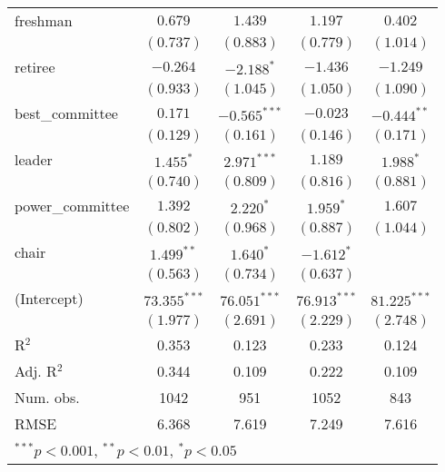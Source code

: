 \documentclass[12pt]{article}
\begin{document}
\begin{table}[H]
\begin{center}
\begin{tabular}{l c c c c }
			freshman               & $0.679$        & $1.439$         & $1.197$        & $0.402$        \\
			& $(0.737)$      & $(0.883)$       & $(0.779)$      & $(1.014)$      \\
			retiree                & $-0.264$       & $-2.188^{*}$    & $-1.436$       & $-1.249$       \\
			& $(0.933)$      & $(1.045)$       & $(1.050)$      & $(1.090)$      \\
			best\_committee        & $0.171$        & $-0.565^{***}$  & $-0.023$       & $-0.444^{**}$  \\
			& $(0.129)$      & $(0.161)$       & $(0.146)$      & $(0.171)$      \\
			leader                 & $1.455^{*}$    & $2.971^{***}$   & $1.189$        & $1.988^{*}$    \\
			& $(0.740)$      & $(0.809)$       & $(0.816)$      & $(0.881)$      \\
			power\_committee       & $1.392$        & $2.220^{*}$     & $1.959^{*}$    & $1.607$        \\
			& $(0.802)$      & $(0.968)$       & $(0.887)$      & $(1.044)$      \\
			chair                  & $1.499^{**}$   & $1.640^{*}$     & $-1.612^{*}$   &                \\
			& $(0.563)$      & $(0.734)$       & $(0.637)$      &                \\
			(Intercept)            & $73.355^{***}$ & $76.051^{***}$  & $76.913^{***}$ & $81.225^{***}$ \\
			& $(1.977)$      & $(2.691)$       & $(2.229)$      & $(2.748)$      \\
			\hline
			R$^2$                  & 0.353          & 0.123           & 0.233          & 0.124          \\
			Adj. R$^2$             & 0.344          & 0.109           & 0.222          & 0.109          \\
			Num. obs.              & 1042           & 951             & 1052           & 843            \\
			RMSE                   & 6.368          & 7.619           & 7.249          & 7.616          \\
			\hline
			\multicolumn{5}{l}{\scriptsize{$^{***}p<0.001$, $^{**}p<0.01$, $^*p<0.05$}}
		\end{tabular}
	\end{center}
\end{table}
\end{document}
